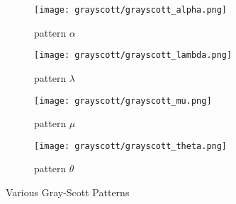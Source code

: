 \begin{figure}[tbh]
\begin{center}
	\begin{subfigure}[tbh]{0.475\textwidth}
	\begin{center}
	\texttt{[image: grayscott/grayscott\_alpha.png]}
	\caption{ pattern $\alpha$ }
	\end{center}
	\end{subfigure}
\hfill
	\begin{subfigure}[tbh]{0.475\textwidth}
	\begin{center}
	\texttt{[image: grayscott/grayscott\_lambda.png]}
	\caption{ pattern $\lambda$ }
	\end{center}
	\end{subfigure}
\hfill
	\begin{subfigure}[tbh]{0.475\textwidth}
	\begin{center}
	\texttt{[image: grayscott/grayscott\_mu.png]}
	\caption{ pattern $\mu$ }
	\end{center}
	\end{subfigure}
\hfill
	\begin{subfigure}[tbh]{0.475\textwidth}
	\begin{center}
	\texttt{[image: grayscott/grayscott\_theta.png]}
	\caption{ pattern $\theta$ }
	\end{center}
	\end{subfigure}
\hfill

\end{center}
\caption{Various Gray-Scott Patterns \label{grayscott-produced} }
\end{figure}